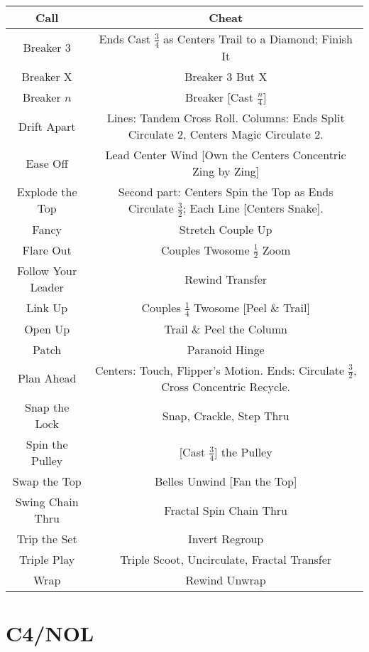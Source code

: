 \documentclass{article}
\begin{document}
\begin{center}
  \begin{tabular}{c | c}
    Call & Cheat \\ \hline
    Breaker 3 & Ends Cast $\frac34$ as Centers Trail to a Diamond; Finish It \\
    Breaker X & Breaker 3 But X \\
    Breaker $n$ & Breaker [Cast $\frac{n}{4}$] \\
    Drift Apart & Lines: Tandem Cross Roll.  Columns: Ends Split Circulate 2, Centers Magic Circulate 2. \\
    Ease Off & Lead Center Wind [Own the Centers Concentric Zing by Zing] \\
    Explode the Top & Second part: Centers Spin the Top as Ends Circulate $\frac32$; Each Line [Centers Snake]. \\
    Fancy & Stretch Couple Up \\
    Flare Out & Couples Twosome $\frac12$ Zoom \\
    Follow Your Leader & Rewind Transfer \\
    Link Up & Couples $\frac14$ Twosome [Peel \& Trail] \\
    Open Up & Trail \& Peel the Column \\
    Patch & Paranoid Hinge \\
    Plan Ahead & Centers: Touch, Flipper's Motion.  Ends: Circulate $\frac32$, Cross Concentric Recycle. \\
    Snap the Lock & Snap, Crackle, Step Thru \\
    Spin the Pulley & [Cast $\frac34$] the Pulley \\
    Swap the Top & Belles Unwind [Fan the Top] \\
    Swing Chain Thru & Fractal Spin Chain Thru \\
    Trip the Set & Invert Regroup \\
    Triple Play & Triple Scoot, Uncirculate, Fractal Transfer \\
    Wrap & Rewind Unwrap \\
  \end{tabular}
\end{center}

\section*{C4/NOL}
\end{document}
